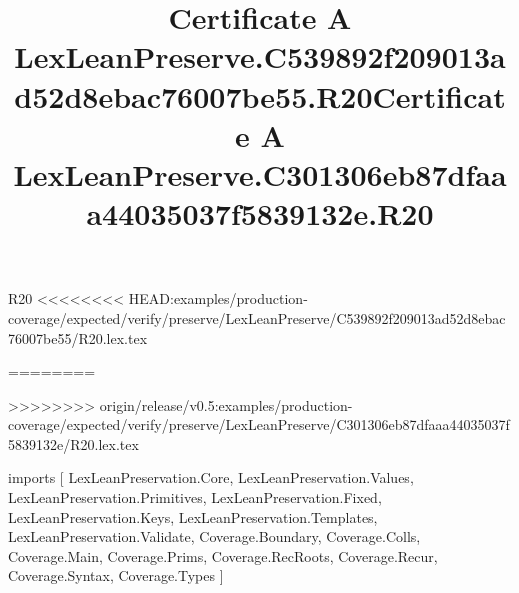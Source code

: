 \begin{lexlean}{R20}
<<<<<<<< HEAD:examples/production-coverage/expected/verify/preserve/LexLeanPreserve/C539892f209013ad52d8ebac76007be55/R20.lex.tex
\title{Certificate A LexLeanPreserve.C539892f209013ad52d8ebac76007be55.R20}
========
\title{Certificate A LexLeanPreserve.C301306eb87dfaaa44035037f5839132e.R20}
>>>>>>>> origin/release/v0.5:examples/production-coverage/expected/verify/preserve/LexLeanPreserve/C301306eb87dfaaa44035037f5839132e/R20.lex.tex
\begin{coremodule}
imports [
  LexLeanPreservation.Core,
  LexLeanPreservation.Values,
  LexLeanPreservation.Primitives,
  LexLeanPreservation.Fixed,
  LexLeanPreservation.Keys,
  LexLeanPreservation.Templates,
  LexLeanPreservation.Validate,
  Coverage.Boundary,
  Coverage.Colls,
  Coverage.Main,
  Coverage.Prims,
  Coverage.RecRoots,
  Coverage.Recur,
  Coverage.Syntax,
  Coverage.Types
]


\end{coremodule}
\end{lexlean}
